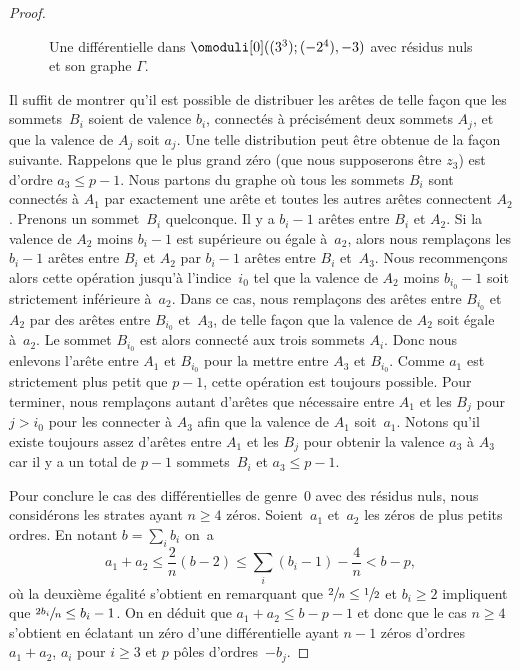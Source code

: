\begin{proof}
\begin{figure}[htb]
\caption{Une différentielle dans $\omoduli[0]((3^3);(-2^4),-3)$ avec résidus nuls et son graphe $\Gamma$.} \label{fig:troiszerossansres}
\end{figure}

Il suffit de montrer qu'il est possible de distribuer les arêtes de telle façon que les sommets~$B_{i}$ soient de valence $b_{i}$, connectés à précisément deux sommets $A_{j}$, et que la valence de $A_{j}$ soit $a_{j}$.
Une telle distribution peut être obtenue de la façon suivante. Rappelons que le plus grand zéro (que nous supposerons être $z_{3}$) est d'ordre $a_{3}\leq p-1$. Nous partons du graphe où tous les sommets $B_{i}$ sont connectés à $A_{1}$ par exactement une arête et toutes les autres arêtes connectent $A_{2}$. Prenons un sommet~$B_{i}$ quelconque. Il y a $b_{i}-1$ arêtes entre $B_{i}$ et $A_{2}$. Si la valence de $A_{2}$ moins $b_{i}-1$ est supérieure ou égale à~$a_{2}$, alors nous remplaçons les $b_{i}-1$ arêtes entre $B_{i}$ et $A_{2}$ par $b_{i}-1$ arêtes entre $B_{i}$ et~$A_{3}$. Nous recommençons alors cette opération jusqu'à l'indice~$i_{0}$ tel que la valence de $A_{2}$ moins $b_{i_{0}}-1$ soit strictement inférieure à~$a_{2}$. Dans ce cas, nous remplaçons des arêtes entre $B_{i_{0}}$ et $A_{2}$ par des arêtes entre $B_{i_{0}}$ et~$A_{3}$, de telle façon que la valence de $A_{2}$ soit égale à~$a_{2}$. Le sommet $B_{i_{0}}$ est alors connecté aux trois sommets $A_{i}$. Donc nous enlevons l'arête entre $A_{1}$ et $B_{i_{0}}$ pour la mettre entre $A_{3}$ et $B_{i_{0}}$. Comme $a_{1}$ est strictement plus petit que $p-1$, cette opération est toujours possible. Pour terminer, nous remplaçons autant d'arêtes que nécessaire entre $A_{1}$ et les $B_{j}$ pour $j > i_{0}$ pour les connecter à $A_{3}$ afin que la valence de $A_{1}$ soit~$a_{1}$. Notons qu'il existe toujours assez d'arêtes entre $A_{1}$ et les $B_{j}$ pour obtenir la valence $a_{3}$ à $A_{3}$ car il y a un total de $p-1$ sommets~$B_{i}$ et $a_{3}\leq p-1$.

Pour conclure le cas des différentielles de genre~$0$ avec des résidus nuls, nous considérons les strates ayant $n\geq4$ zéros. Soient~$a_{1}$ et~$a_{2}$ les zéros de plus petits ordres. En notant $b=\sum_{i} b_{i}$ on~a
\begin{equation*}
a_{1}+a_{2} \leq \frac{2}{n}\left(b-2\right)\leq \sum_{i}(b_{i}-1) -\frac{4}{n} < b -p,
\end{equation*}
où la deuxième égalité s'obtient en remarquant que $\sfrac{2}{n} \leq \sfrac {1}{2}$ et $b_{i}\geq2$ impliquent que $\sfrac{2b_{i}}{n}\leq b_{i}-1$. On en déduit que $ a_{1}+a_{2} \leq b -p - 1$ et donc que le cas $n\geq 4$ s'obtient en éclatant un zéro d'une différentielle ayant $n-1$ zéros d'ordres $a_{1}+a_{2}$, $a_{i}$ pour $i\geq 3$ et $p$ pôles d'ordres~$-b_{j}$.
\end{proof}


